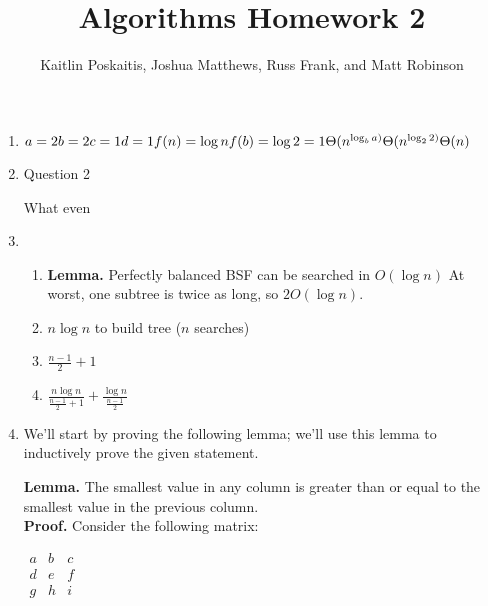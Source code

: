 \documentclass[12pt]{article}
\title{\bf Algorithms Homework 2}
\author{Kaitlin Poskaitis, Joshua Matthews, Russ Frank, and Matt Robinson}
\date{}
\begin{document}
\maketitle

\begin{enumerate}

\item

  $a = 2\\
  b = 2\\
  c = 1\\
  d = 1\\
  f(n) = \log n\\
  f(b) = \log 2 = 1\\
  \Theta (n^{\log_b a)}\\
  \Theta (n^{\log_2 2)}\\
  \Theta (n)\\$

\item Question 2

  What even

\item

  \begin{enumerate}
    \item \textbf{Lemma.} Perfectly balanced BSF can be searched in $O(\log n)$
    At worst, one subtree is twice as long, so $2O(\log n)$.

    \item $n \log n$ to build tree ($n$ searches)

    \item $\frac{n - 1}{2} + 1$

    \item $\frac{n\log n}{\frac{n - 1}{2} + 1} + \frac{\log n}{\frac{n - 1}{2}}$
  \end{enumerate}

\item 

  We'll start by proving the following lemma; we'll use this lemma to
  inductively prove the given statement.

  \textbf{Lemma.} The smallest value in any column is greater than or equal to
  the smallest value in the previous column.\\
  \textbf{Proof.} Consider the following matrix:

  $\begin{matrix}
    a & b & c \\
    d & e & f \\
    g & h & i
  \end{matrix}$


\end{enumerate}
\end{document}
